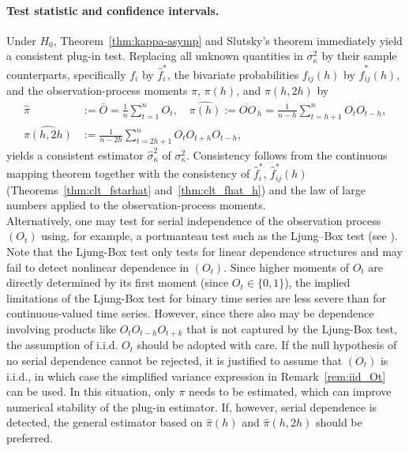 ﻿\documentclass[12pt,a4paper]{scrreprt}
\theoremstyle{definition}
\begin{document}
\paragraph{Test statistic and confidence intervals.}
Under $H_0$, Theorem~\ref{thm:kappa-asymp} and Slutsky's theorem  \citep[Theorem~13.18]{klenke2005}
immediately yield a consistent plug-in test. Replacing all unknown
quantities in $\sigma^2_\kappa$ by their sample counterparts,
specifically $f_i$ by $\hat{f}^*_i$, the bivariate probabilities
$f_{ij}(h)$ by $\hat{f}^*_{ij}(h)$, and the observation-process
moments $\pi$, $\pi(h)$, and $\pi(h,2h)$ by
\begin{align*}
    \hat{\pi}      &:= \bar{O}
        = \frac{1}{n}\sum_{t=1}^n O_t, \quad
    \widehat{\pi(h)}   := \overline{OO}_{\,h}
        = \frac{1}{n-h}\sum_{t=h+1}^n O_t O_{t-h}, \\
    \widehat{\pi(h,2h)} &:= \frac{1}{n-2h}
        \sum_{t=2h+1}^n O_t O_{t+h} O_{t-h},
\end{align*}
yields a consistent estimator $\hat{\sigma}^2_\kappa$ of
$\sigma^2_\kappa$. Consistency follows from the continuous mapping
theorem together with the consistency of $\hat{f}^*_i$,
$\hat{f}^*_{ij}(h)$ (Theorems~\ref{thm:clt_fstarhat}
and~\ref{thm:clt_fhat_h}) and the law of large numbers applied to
the observation-process moments.\\
Alternatively, one may test for serial independence of the observation 
process $(O_t)$ using, for example, a portmanteau test such as the Ljung–Box 
test (see \citet[Chapter~1.6]{brockwell_davis_2016}). Note that the Ljung-Box test
only tests for linear dependence structures and may fail to detect nonlinear dependence in $(O_t)$.
Since higher moments of $O_t$ are directly determined by its first moment (since $O_t \in \{0,1\}$),
the implied limitations of the Ljung-Box test for binary time series are less severe than for continuous-valued 
time series. However, since there also may be dependence involving products like $O_t O_{t-h} O_{t+k}$
that is not captured by the Ljung-Box test, the assumption of i.i.d. $O_t$ should be adopted with care.
If the null hypothesis of no serial dependence cannot
be rejected, it is justified to assume that $(O_t)$ is i.i.d., in which
case the simplified variance expression in
Remark~\ref{rem:iid_Ot} can be used. In this situation, only $\pi$
needs to be estimated, which can improve numerical stability of the
plug-in estimator. If, however, serial dependence is detected, the
general estimator based on $\hat{\pi}(h)$ and
$\hat{\pi}(h,2h)$ should be preferred.\\
\end{document}
